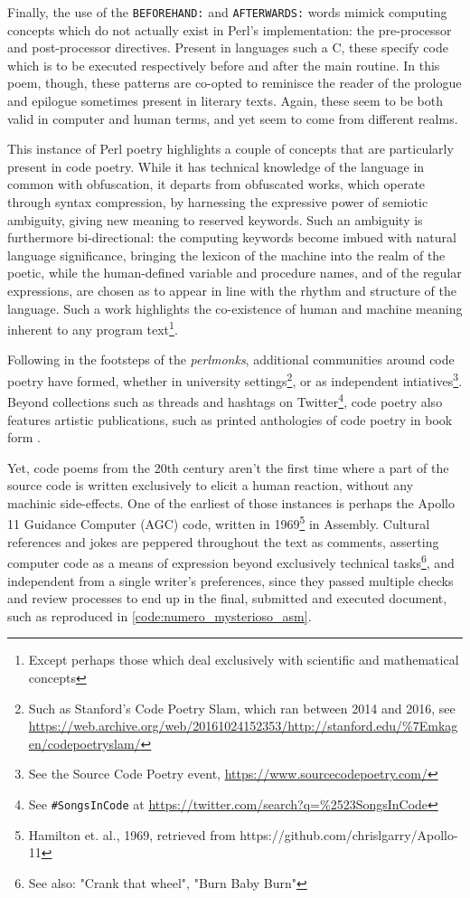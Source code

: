 Finally, the use of the \lstinline{BEFOREHAND:} and \lstinline{AFTERWARDS:} words mimick computing concepts which do not actually exist in Perl's implementation: the pre-processor and post-processor directives. Present in languages such a C, these specify code which is to be executed respectively before and after the main routine. In this poem, though, these patterns are co-opted to reminisce the reader of the prologue and epilogue sometimes present in literary texts. Again, these seem to be both valid in computer and human terms, and yet seem to come from different realms.

This instance of Perl poetry highlights a couple of concepts that are particularly present in code poetry. While it has technical knowledge of the language in common with obfuscation, it departs from obfuscated works, which operate through syntax compression, by harnessing the expressive power of semiotic ambiguity, giving new meaning to reserved keywords. Such an ambiguity is furthermore bi-directional: the computing keywords become imbued with natural language significance, bringing the lexicon of the machine into the realm of the poetic, while the human-defined variable and procedure names, and of the regular expressions, are chosen as to appear in line with the rhythm and structure of the language. Such a work highlights the co-existence of human and machine meaning inherent to any program text\footnote{Except perhaps those which deal exclusively with scientific and mathematical concepts}.

Following in the footsteps of the \emph{perlmonks}, additional communities around code poetry have formed, whether in university settings\footnote{Such as Stanford's Code Poetry Slam, which ran between 2014 and 2016, see \url{https://web.archive.org/web/20161024152353/http://stanford.edu/\%7Emkagen/codepoetryslam/} }, or as independent intiatives\footnote{See the Source Code Poetry event, \url{https://www.sourcecodepoetry.com/}}. Beyond collections such as threads and hashtags on Twitter\footnote{See \lstinline{#SongsInCode} at \url{https://twitter.com/search?q=\%2523SongsInCode}}, code poetry also features artistic publications, such as printed anthologies of code poetry in book form \citep{bertram_code_2012} \citep{holden_code_2016}.

Yet, code poems from the 20th century aren't the first time where a part of the source code is written exclusively to elicit a human reaction, without any machinic side-effects. One of the earliest of those instances is perhaps the Apollo 11 Guidance Computer (AGC) code, written in 1969\footnote{Hamilton et. al., 1969, retrieved from https://github.com/chrislgarry/Apollo-11} in Assembly. Cultural references and jokes are peppered throughout the text as comments, asserting computer code as a means of expression beyond exclusively technical tasks\footnote{See also: "Crank that wheel", "Burn Baby Burn"}, and independent from a single writer's preferences, since they passed multiple checks and review processes to end up in the final, submitted and executed document, such as reproduced in \ref{code:numero_mysterioso_asm}.

